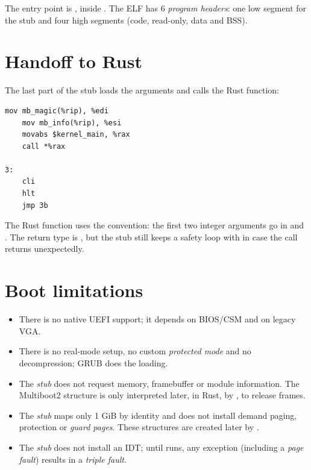 The entry point is , inside . The ELF has
6 \emph{program headers}: one low  segment for the stub and four high
segments (code, read-only, data and BSS).

\section{Handoff to Rust}

The last part of the stub loads the arguments and calls the Rust function:

\begin{lstlisting}[caption={Call to \code{kernel\_main} from the stub.},label={lst:callmain}]
    mov mb_magic(%rip), %edi
    mov mb_info(%rip), %esi
    movabs $kernel_main, %rax
    call *%rax

3:
    cli
    hlt
    jmp 3b
\end{lstlisting}

The Rust function uses the  convention: the first two
integer arguments go in  and . The return type is
\code{!}, but the stub still keeps a safety loop with
 in case the call returns unexpectedly.

\section{Boot limitations}

\begin{itemize}
  \item There is no native UEFI support; it depends on BIOS/CSM and on legacy
        VGA.
  \item There is no real-mode setup, no custom \emph{protected mode} and no
        decompression; GRUB does the loading.
  \item The \emph{stub} does not request memory, framebuffer or module
        information. The Multiboot2 structure is only interpreted
        later, in Rust, by , to release frames.
  \item The \emph{stub} maps only 1 GiB by identity and does not install
        demand paging,  protection or \emph{guard pages}. These
        structures are created later by .
  \item The \emph{stub} does not install an IDT; until  runs,
        any exception (including a \emph{page fault}) results in a
        \emph{triple fault}.
\end{itemize}

